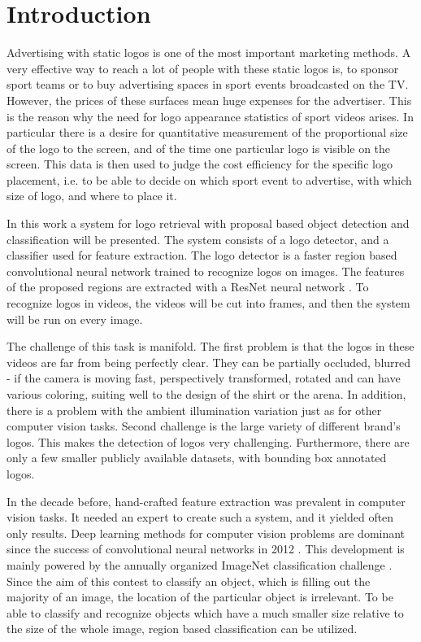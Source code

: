 \chapter{Introduction}

Advertising with static logos is one of the most important marketing methods. A very effective way to reach a lot of people with these static logos is, to sponsor sport teams or to buy advertising spaces in sport events broadcasted on the TV. However, the prices of these surfaces mean huge expenses for the advertiser. This is the reason why the need for logo appearance statistics of sport videos arises. In particular there is a desire for quantitative measurement of the proportional size of the logo to the screen, and of the time one particular logo is visible on the screen. This data is then used to judge the cost efficiency for the specific logo placement, i.e. to be able to decide on which sport event to advertise, with which size of logo, and where to place it.

In this work a system for logo retrieval with proposal based object detection and classification will be presented. The system consists of a logo detector, and a classifier used for feature extraction. The logo detector is a faster region based convolutional neural network \cite{NIPS2015_5638} trained to recognize logos on images. The features of the proposed regions are extracted with a ResNet neural network \cite{DBLP:journals/corr/HeZRS15}. To recognize logos in videos, the videos will be cut into frames, and then the system will be run on every image.

The challenge of this task is manifold. The first problem is that the logos in these videos are far from being perfectly clear. They can be partially occluded, blurred - if the camera is moving fast, perspectively transformed, rotated and can have various coloring, suiting well to the design of the shirt or the arena. In addition, there is a problem with the ambient illumination variation just as for other computer vision tasks.
Second challenge is the large variety of different brand's logos. This makes the detection of logos very challenging.
Furthermore, there are only a few smaller publicly available datasets, with bounding box annotated logos.

In the decade before, hand-crafted feature extraction was prevalent in computer vision tasks. It needed an expert to create such a system, and it yielded often only results. Deep learning methods for computer vision problems are dominant since the success of convolutional neural networks in 2012 \cite{NIPS2012_4824}. This development is mainly powered by the annually organized ImageNet classification challenge \cite{ILSVRC15}. Since the aim of this contest to classify an object, which is filling out the majority of an image, the location of the particular object is irrelevant. To be able to classify and recognize objects which have a much smaller size relative to the size of the whole image, region based classification can be utilized.

